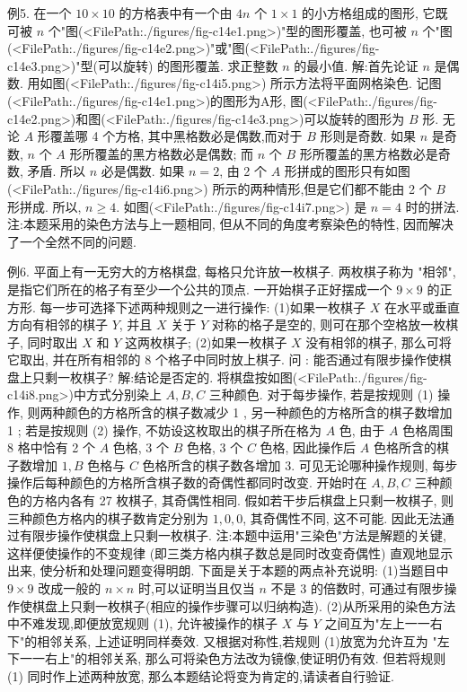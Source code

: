 例5. 在一个 $10 \times 10$ 的方格表中有一个由 $4 n$ 个 $1 \times 1$ 的小方格组成的图形, 它既可被 $n$ 个"图(<FilePath:./figures/fig-c14e1.png>)"型的图形覆盖, 也可被 $n$ 个"图(<FilePath:./figures/fig-c14e2.png>)"或"图(<FilePath:./figures/fig-c14e3.png>)"型(可以旋转) 的图形覆盖.
求正整数 $n$ 的最小值.
解:首先论证 $n$ 是偶数.
用如图(<FilePath:./figures/fig-c14i5.png>) 所示方法将平面网格染色.
记图(<FilePath:./figures/fig-c14e1.png>)的图形为A形, 图(<FilePath:./figures/fig-c14e2.png>)和图(<FilePath:./figures/fig-c14e3.png>)可以旋转的图形为 $B$ 形.
无论 $A$ 形覆盖哪 4 个方格, 其中黑格数必是偶数,而对于 $B$ 形则是奇数.
如果 $n$ 是奇数, $n$ 个 $A$ 形所覆盖的黑方格数必是偶数; 而 $n$ 个 $B$ 形所覆盖的黑方格数必是奇数, 矛盾.
所以 $n$ 必是偶数.
如果 $n=2$, 由 2 个 $A$ 形拼成的图形只有如图(<FilePath:./figures/fig-c14i6.png>) 所示的两种情形,但是它们都不能由 2 个 $B$ 形拼成.
所以, $n \geqslant 4$. 如图(<FilePath:./figures/fig-c14i7.png>) 是 $n=4$ 时的拼法.
注:本题采用的染色方法与上一题相同, 但从不同的角度考察染色的特性, 因而解决了一个全然不同的问题.



例6. 平面上有一无穷大的方格棋盘, 每格只允许放一枚棋子.
两枚棋子称为 "相邻", 是指它们所在的格子有至少一个公共的顶点.
一开始棋子正好摆成一个 $9 \times 9$ 的正方形.
每一步可选择下述两种规则之一进行操作:
(1)如果一枚棋子 $X$ 在水平或垂直方向有相邻的棋子 $Y$, 并且 $X$ 关于 $Y$ 对称的格子是空的, 则可在那个空格放一枚棋子, 同时取出 $X$ 和 $Y$ 这两枚棋子;
(2)如果一枚棋子 $X$ 没有相邻的棋子, 那么可将它取出, 并在所有相邻的 8 个格子中同时放上棋子.
问 : 能否通过有限步操作使棋盘上只剩一枚棋子?
解:结论是否定的.
将棋盘按如图(<FilePath:./figures/fig-c14i8.png>)中方式分别染上 $A, B, C$ 三种颜色.
对于每步操作, 若是按规则 (1) 操作, 则两种颜色的方格所含的棋子数减少 1 , 另一种颜色的方格所含的棋子数增加 1 ; 若是按规则 (2) 操作, 不妨设这枚取出的棋子所在格为 $A$ 色, 由于 $A$ 色格周围 8 格中恰有 2 个 $A$ 色格, 3 个 $B$ 色格, 3 个 $C$ 色格, 因此操作后 $A$ 色格所含的棋子数增加 $1, B$ 色格与 $C$ 色格所含的棋子数各增加 3. 可见无论哪种操作规则, 每步操作后每种颜色的方格所含棋子数的奇偶性都同时改变.
开始时在 $A, B, C$ 三种颜色的方格内各有 27 枚棋子, 其奇偶性相同.
假如若干步后棋盘上只剩一枚棋子, 则三种颜色方格内的棋子数肯定分别为 $1,0,0$, 其奇偶性不同, 这不可能.
因此无法通过有限步操作使棋盘上只剩一枚棋子.
注:本题中运用"三染色"方法是解题的关键, 这样便使操作的不变规律 (即三类方格内棋子数总是同时改变奇偶性) 直观地显示出来, 使分析和处理问题变得明朗.
下面是关于本题的两点补充说明:
(1)当题目中 $9 \times 9$ 改成一般的 $n \times n$ 时,可以证明当且仅当 $n$ 不是 3 的倍数时, 可通过有限步操作使棋盘上只剩一枚棋子(相应的操作步骤可以归纳构造).
(2)从所采用的染色方法中不难发现,即便放宽规则 (1), 允许被操作的棋子 $X$ 与 $Y$ 之间互为"左上一一右下"的相邻关系, 上述证明同样奏效.
又根据对称性,若规则 (1)放宽为允许互为 "左下一一右上"的相邻关系, 那么可将染色方法改为镜像,使证明仍有效.
但若将规则 (1) 同时作上述两种放宽, 那么本题结论将变为肯定的,请读者自行验证.



